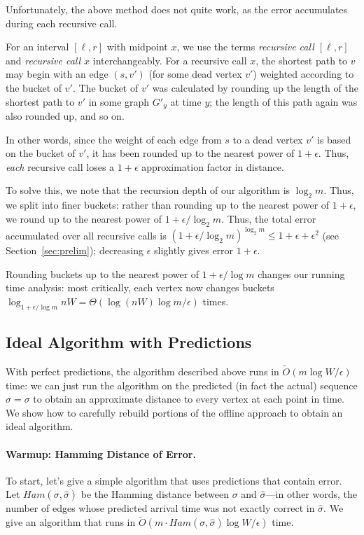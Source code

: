 Unfortunately, the above method does not quite work, as the error accumulates during each recursive call.  

For an interval $[\ell, r]$ with midpoint $x$, we use the terms \emph{recursive call $[\ell, r]$} and \emph{recursive call $x$} interchangeably.
For a recursive call $x$, the shortest path to $v$ may begin with an edge $(s, v')$ (for some dead vertex $v'$) weighted according to the bucket of $v'$.  The bucket of $v'$ was calculated by rounding up the length of the shortest path to $v'$ in some graph $G'_{y}$ at time $y$; the length of this path again was also rounded up, and so on.

In other words, since the weight of each edge from $s$ to a dead vertex $v'$ is based on the bucket of $v'$, it has been rounded up to the nearest power of $1 + \epsilon$.  Thus, \emph{each} recursive call loses a $1 + \epsilon$ approximation factor in distance.

To solve this, we note that the recursion depth of our algorithm is $\log_2 m$.  Thus, we split into finer buckets: rather than rounding up to the nearest power of $1 + \epsilon$, we round up to the nearest power of $1 + \epsilon/\log_2 m$.  Thus, the total error accumulated over all recursive calls is $(1 + \epsilon/\log_2 m)^{\log_2 m} \leq 1 + \epsilon + \epsilon^2$ (see Section~\ref{sec:prelim}); decreasing $\epsilon$ slightly gives error $1 + \epsilon$.  

Rounding buckets up to the nearest power of $1 + \epsilon/\log m$ changes our running time analysis: most critically, each vertex now changes buckets $\log_{1 + \epsilon/\log m} nW = \Theta(\log(nW) \log m/\epsilon)$ times.  

\subsection{Ideal Algorithm with Predictions}

With perfect predictions, the algorithm described above runs in $\tilde{O}(m\log W/\epsilon)$ time: we can just run the algorithm on the predicted (in fact the actual) sequence $\hat{\sigma} = \sigma$ to obtain an approximate distance to every vertex at each point in time.  
We show how to carefully rebuild portions of the offline approach to obtain an ideal algorithm.

\paragraph{Warmup: Hamming Distance of Error.}  To start, let's give a simple algorithm that uses predictions that contain error.  
Let $Ham(\sigma, \hat{\sigma})$ be the Hamming distance between $\sigma$ and $\hat{\sigma}$---in other words, the number of edges whose predicted arrival time was not exactly correct in $\hat{\sigma}$.  We give an algorithm that runs in $\tilde{O}(m\cdot Ham(\sigma, \hat{\sigma})\log W/\epsilon)$ time.

